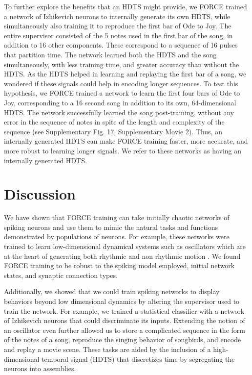 \documentclass[11pt]{article} %
\begin{document}
To further explore the benefits that an HDTS might provide, we FORCE trained a network of 
Izhikevich neurons to internally generate its own HDTS, while simultaneously also training 
it to reproduce the first bar of Ode to Joy.  
The entire supervisor consisted of the 5 notes used in the first bar of the song, 
in addition to 16 other components.  These correspond to a sequence of 16 pulses that partition time.  
The network learned both the HDTS and the song simultaneously, 
with less training time, and greater accuracy than without the HDTS.  
As the HDTS helped in learning and replaying the first bar of a song, 
we wondered if these signals could help in encoding longer sequences.  
To test this hypothesis, we FORCE trained a network to learn the first four bars of Ode to Joy, 
corresponding to a 16 second song in addition to its own, 64-dimensional HDTS.  
The network successfully learned the song post-training, without any error in the sequence of 
notes in spite of the length and complexity of the sequence (see Supplementary Fig. 17, Supplementary Movie 2).  
Thus, an internally generated HDTS can make FORCE training faster, more accurate, 
and more robust to learning longer signals.  We refer to these networks as having 
an internally generated HDTS.    



\section*{Discussion} 

We have shown that FORCE training can take initially chaotic networks of 
spiking neurons and use them to mimic the natural tasks and functions demonstrated 
by populations of neurons.  For example, these networks were trained to learn 
low-dimensional dynamical systems such as oscillators which are at the heart of 
generating both rhythmic and non rhythmic motion \cite{CHURCHLAND1}.   
We found FORCE training to be robust to the spiking model employed, 
initial network states, and synaptic connection types.   

Additionally, we showed that we could train spiking networks to display behaviors 
beyond low dimensional dynamics by altering the supervisor used to train the network.  
For example, we trained a statistical classifier with a network of Izhikevich neurons 
that could discriminate its inputs.  
Extending the notion of an oscillator even further allowed us to store a complicated 
sequence in the form of the notes of a song, reproduce the singing behavior of songbirds, 
and encode and replay a movie scene. 
These tasks are aided by the inclusion of a high-dimensional temporal signal (HDTS) 
that discretizes time by segregating the neurons into assemblies.  
 
\end{document}
